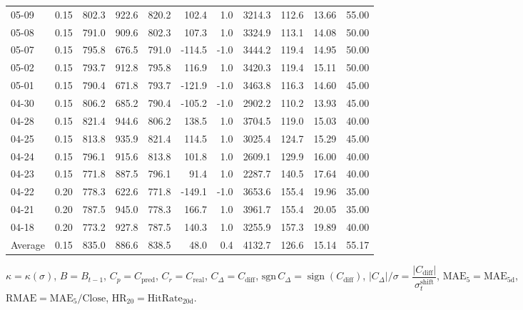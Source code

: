 \begin{threeparttable}
{\begin{tabular}{lrrrrrrrrrr}
05-09 & 0.15 & 802.3 & 922.6 & 820.2 & 102.4 & 1.0 & 3214.3 & 112.6 & 13.66 & 55.00 \\
05-08 & 0.15 & 791.0 & 909.6 & 802.3 & 107.3 & 1.0 & 3324.9 & 113.1 & 14.08 & 50.00 \\
05-07 & 0.15 & 795.8 & 676.5 & 791.0 & -114.5 & -1.0 & 3444.2 & 119.4 & 14.95 & 50.00 \\
05-02 & 0.15 & 793.7 & 912.8 & 795.8 & 116.9 & 1.0 & 3420.3 & 119.4 & 15.11 & 50.00 \\
05-01 & 0.15 & 790.4 & 671.8 & 793.7 & -121.9 & -1.0 & 3463.8 & 116.3 & 14.60 & 45.00 \\
04-30 & 0.15 & 806.2 & 685.2 & 790.4 & -105.2 & -1.0 & 2902.2 & 110.2 & 13.93 & 45.00 \\
04-28 & 0.15 & 821.4 & 944.6 & 806.2 & 138.5 & 1.0 & 3704.5 & 119.0 & 15.03 & 40.00 \\
04-25 & 0.15 & 813.8 & 935.9 & 821.4 & 114.5 & 1.0 & 3025.4 & 124.7 & 15.29 & 45.00 \\
04-24 & 0.15 & 796.1 & 915.6 & 813.8 & 101.8 & 1.0 & 2609.1 & 129.9 & 16.00 & 40.00 \\
04-23 & 0.15 & 771.8 & 887.5 & 796.1 & 91.4 & 1.0 & 2287.7 & 140.5 & 17.64 & 40.00 \\
04-22 & 0.20 & 778.3 & 622.6 & 771.8 & -149.1 & -1.0 & 3653.6 & 155.4 & 19.96 & 35.00 \\
04-21 & 0.20 & 787.5 & 945.0 & 778.3 & 166.7 & 1.0 & 3961.7 & 155.4 & 20.05 & 35.00 \\
04-18 & 0.20 & 773.2 & 927.8 & 787.5 & 140.3 & 1.0 & 3255.9 & 157.3 & 19.89 & 40.00 \\
Average & 0.15 & 835.0 & 886.6 & 838.5 & 48.0 & 0.4 & 4132.7 & 126.6 & 15.14 & 55.17 \\
\bottomrule
\end{tabular}
}%
\begin{tablenotes}\footnotesize
\item $\kappa=\kappa(\sigma)$, $B=B_{t-1}$, $C_p=C_{\text{pred}}$, $C_r=C_{\text{real}}$, $C_\Delta=C_{\text{diff}}$, $\mathrm{sgn}\,C_\Delta=\operatorname{sign}(C_{\text{diff}})$, $|C_\Delta|/\sigma=\dfrac{|C_{\text{diff}}|}{\sigma_t^{\text{shift}}}$, $\mathrm{MAE}_5=\mathrm{MAE}_{5\text{d}}$, $\mathrm{RMAE}= \mathrm{MAE}_5 / \text{Close}$, $\mathrm{HR}_{20}=\mathrm{HitRate}_{20\text{d}}$.
\end{tablenotes}
\end{threeparttable}
\endgroup